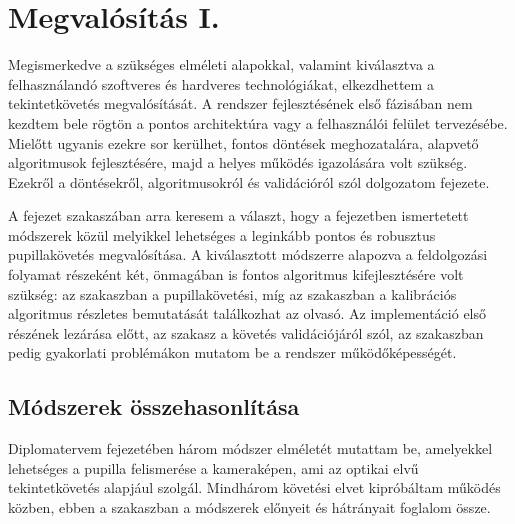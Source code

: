 \chapter{Megvalósítás I.}\label{sect:megvalositas_1}

Megismerkedve a szükséges elméleti alapokkal, valamint kiválasztva a felhasználandó szoftveres és hardveres technológiákat, elkezdhettem a tekintetkövetés megvalósítását. A rendszer fejlesztésének első fázisában nem kezdtem bele rögtön a pontos architektúra vagy a felhasználói felület tervezésébe. Mielőtt ugyanis ezekre sor kerülhet, fontos döntések meghozatalára, alapvető algoritmusok fejlesztésére, majd a helyes működés igazolására volt szükség. Ezekről a döntésekről, algoritmusokról és validációról szól dolgozatom  fejezete.

\bigskip

A fejezet  szakaszában arra keresem a választ, hogy a  fejezetben ismertetett módszerek közül melyikkel lehetséges a leginkább pontos és robusztus pupillakövetés megvalósítása. A kiválasztott módszerre alapozva a feldolgozási folyamat részeként két, önmagában is fontos algoritmus kifejlesztésére volt szükség: az  szakaszban a pupillakövetési, míg az  szakaszban a kalibrációs algoritmus részletes bemutatását találkozhat az olvasó. Az implementáció első részének lezárása előtt, az  szakasz a követés validációjáról szól, az  szakaszban pedig gyakorlati problémákon mutatom be a rendszer működőképességét.

\section{Módszerek összehasonlítása}\label{sect:modsz_osszehasonlitas}

Diplomatervem  fejezetében három módszer elméletét mutattam be, amelyekkel lehetséges a pupilla felismerése a kameraképen, ami az optikai elvű tekintetkövetés alapjául szolgál. Mindhárom követési elvet kipróbáltam működés közben, ebben a szakaszban a módszerek előnyeit és hátrányait foglalom össze.

